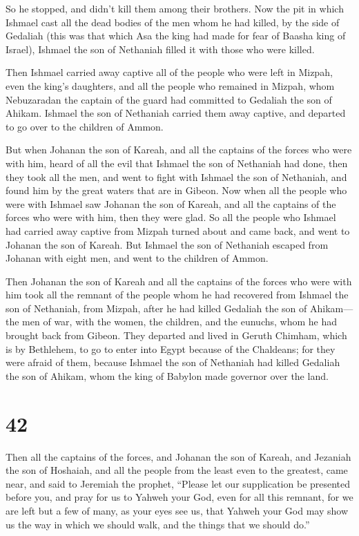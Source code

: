 So he stopped, and didn't kill them among their brothers. 
Now the pit in which Ishmael cast all the dead bodies of the men whom he
had killed, by the side of Gedaliah (this was that which Asa the king
had made for fear of Baasha king of Israel), Ishmael the son of
Nethaniah filled it with those who were killed.

 Then Ishmael carried away captive all of the people who
were left in Mizpah, even the king's daughters, and all the people who
remained in Mizpah, whom Nebuzaradan the captain of the guard had
committed to Gedaliah the son of Ahikam. Ishmael the son of Nethaniah
carried them away captive, and departed to go over to the children of
Ammon.

 But when Johanan the son of Kareah, and all the captains
of the forces who were with him, heard of all the evil that Ishmael the
son of Nethaniah had done,  then they took all the men, and
went to fight with Ishmael the son of Nethaniah, and found him by the
great waters that are in Gibeon.  Now when all the people
who were with Ishmael saw Johanan the son of Kareah, and all the
captains of the forces who were with him, then they were glad.
 So all the people who Ishmael had carried away captive
from Mizpah turned about and came back, and went to Johanan the son of
Kareah.  But Ishmael the son of Nethaniah escaped from
Johanan with eight men, and went to the children of Ammon.

 Then Johanan the son of Kareah and all the captains of the
forces who were with him took all the remnant of the people whom he had
recovered from Ishmael the son of Nethaniah, from Mizpah, after he had
killed Gedaliah the son of Ahikam---the men of war, with the women, the
children, and the eunuchs, whom he had brought back from Gibeon.
 They departed and lived in Geruth Chimham, which is by
Bethlehem, to go to enter into Egypt  because of the
Chaldeans; for they were afraid of them, because Ishmael the son of
Nethaniah had killed Gedaliah the son of Ahikam, whom the king of
Babylon made governor over the land.

\hypertarget{section-41}{%
\section{42}\label{section-41}}

 Then all the captains of the forces, and Johanan the son of
Kareah, and Jezaniah the son of Hoshaiah, and all the people from the
least even to the greatest, came near,  and said to Jeremiah
the prophet, ``Please let our supplication be presented before you, and
pray for us to Yahweh your God, even for all this remnant, for we are
left but a few of many, as your eyes see us,  that Yahweh
your God may show us the way in which we should walk, and the things
that we should do.''


